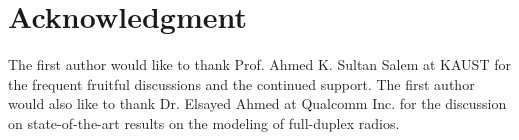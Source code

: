 \documentclass[10pt,journal]{IEEEtran}
\begin{document}
\section*{Acknowledgment}
The first author would like to thank Prof. Ahmed K. Sultan Salem at \ac{KAUST} for the frequent fruitful discussions and the continued support. The first author would also like to thank Dr. Elsayed Ahmed at Qualcomm Inc. for the discussion on state-of-the-art results on the modeling of full-duplex radios.



\end{document}
